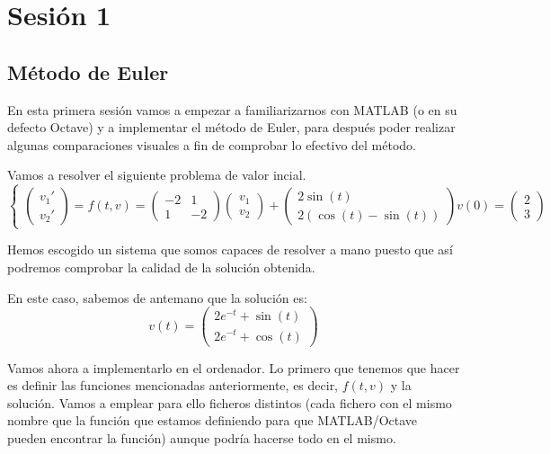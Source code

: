 \section{Sesión 1}
\subsection{Método de Euler}
En esta primera sesión vamos a empezar a familiarizarnos con MATLAB (o en su defecto Octave) y a implementar el método de Euler, para después poder realizar algunas comparaciones visuales a fin de comprobar lo efectivo del método.

Vamos a resolver el siguiente problema de valor incial.
\[\left\{\begin{array}{l}
\left( \begin{array}{c}
v_1' \\
v_2'  \end{array} \right)=f(t,v) =\left( \begin{array}{cc}
-2 & 1 \\
1 & -2 \end{array} \right)\left( \begin{array}{c}
v_1 \\
v_2 \end{array} \right) + \left( \begin{array}{c}
2\sin(t) \\
2(\cos(t)-\sin(t))  \end{array} \right)
v(0) = \left( \begin{array}{c}
2 \\
3  \end{array} \right)\end{array}\right.\]

Hemos escogido un sistema que somos capaces de resolver a mano puesto que así podremos comprobar la calidad de la solución obtenida.

En este caso, sabemos de antemano que la solución es:
\[v(t)=\left( \begin{array}{c}
2e^{-t}+\sin(t) \\
2e^{-t}+\cos(t)  \end{array} \right)\]

Vamos ahora a implementarlo en el ordenador. Lo primero que tenemos que hacer es definir las funciones mencionadas anteriormente, es decir, $f(t,v)$ y la solución. Vamos a emplear para ello ficheros distintos (cada fichero con el mismo nombre que la función que estamos definiendo para que MATLAB/Octave pueden encontrar la función) aunque podría hacerse todo en el mismo.

